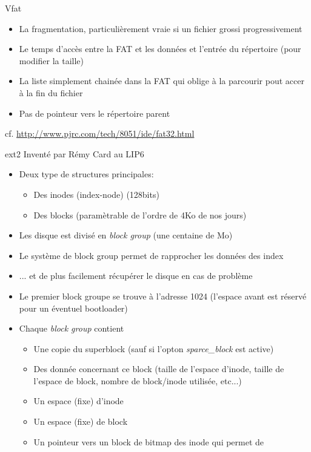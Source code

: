 \begin{frame}[fragile=singleslide]{Vfat}
\begin{itemize}
\begin{itemize}
    \item  La  fragmentation,  particulièrement  vraie si  un  fichier
      grossi progressivement
    \item Le temps d'accès entre la  FAT et les données et l'entrée du
      répertoire (pour modifier la taille)
    \item  La liste simplement  chainée dans  la FAT  qui oblige  à la
      parcourir pout accer à la fin du fichier
    \item Pas de pointeur vers le répertoire parent
    \end{itemize}
  \end{itemize}
  cf. \url{http://www.pjrc.com/tech/8051/ide/fat32.html}
\end{frame}

\begin{frame}[fragile=singleslide]{ext2}
  Inventé par Rémy Card au LIP6
  \begin{itemize}
  \item Deux type de structures principales:
    \begin{itemize}
    \item Des inodes (index-node) (128bits)
    \item Des blocks (paramètrable de l'ordre de 4Ko de nos jours)
    \end{itemize}
  \item Les disque  est divisé en \emph{block group}  (une centaine de
    Mo)
  \item Le système de block group permet de rapprocher les données des
    index
  \item  ... et  de  plus facilement  récupérer  le disque  en cas  de
    problème
  \item Le premier  block groupe se trouve à  l'adresse 1024 (l'espace
    avant est réservé pour un éventuel bootloader)
  \item Chaque \emph{block group} contient
    \begin{itemize}
    \item    Une    copie    du    superblock   (sauf    si    l'opton
      \emph{sparce\_block} est active)
    \item Des donnée concernant  ce block (taille de l'espace d'inode,
      taille  de l'espace  de block,  nombre de  block/inode utilisée,
      etc...)
    \item Un espace (fixe) d'inode
    \item Un espace (fixe) de block
    \item Un pointeur vers un block  de bitmap des inode qui permet de

\end{itemize}
\end{itemize}
\end{frame}
